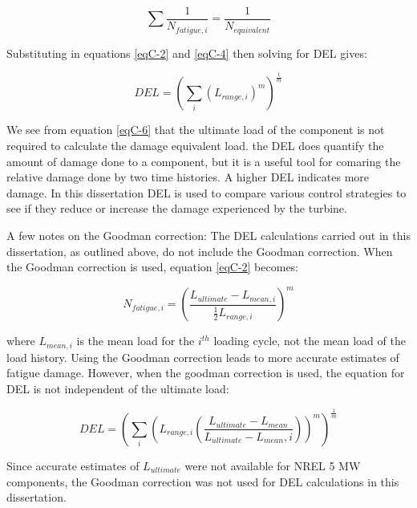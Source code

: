 \begin{equation}
\sum \frac{1}{N_{fatigue, i}} = \frac{1}{N_{equivalent}} \label{eqC-5}
\end{equation}

Substituting in equations \ref{eqC-2} and \ref{eqC-4} then solving for DEL gives:

\begin{equation}
DEL = \left ( \sum_{i} \left ( L_{range,i} \right )^m \right )^{\frac{1}{m}} \label{eqC-6}
\end{equation}

We see from equation \ref{eqC-6} that the ultimate load of the component is not required to calculate the damage equivalent load. the DEL does quantify the amount of damage done to a component, but it is a useful tool for comaring the relative damage done by two time histories. A higher DEL indicates more damage. In this dissertation DEL is used to compare various control strategies to see if they reduce or increase the damage experienced by the turbine.

A few notes on the Goodman correction: The DEL calculations carried out in this dissertation, as outlined above, do not include the Goodman correction. When the Goodman correction is used, equation \ref{eqC-2} becomes:

\begin{equation}
N_{fatigue, i} = \left ( \frac{L_{ultimate}-L_{mean,i}}{\frac{1}{2}L_{range,i}} \right )^m \label{eqC-7}
\end{equation}

where $L_{mean,i}$ is the mean load for the $i^{th}$ loading cycle, not the mean load of the load history. Using the Goodman correction leads to more accurate estimates of fatigue damage. However, when the goodman correction is used, the equation for DEL is not independent of the ultimate load:

\begin{equation}
DEL = \left ( \sum_{i} \left ( L_{range,i}\left ( \frac{L_{ultimate}-L_{mean}}{L_{ultimate}-L_{mean},i} \right ) \right )^m \right )^{\frac{1}{m}} \label{eqC-8}
\end{equation}

Since accurate estimates of $L_{ultimate}$ were not available for NREL 5 MW components, the Goodman correction was not used for DEL calculations in this dissertation.